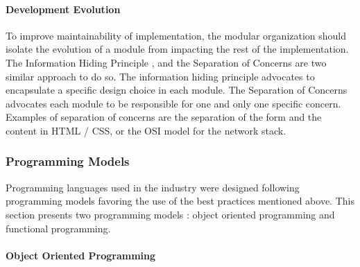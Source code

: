 \paragraph{Development Evolution}

To improve maintainability of implementation, the modular organization should isolate the evolution of a module from impacting the rest of the implementation.
The Information Hiding Principle \cite{Parnas1972}, and the Separation of Concerns \cite{Tarr1999,Hursch1995} are two similar approach to do so.
The information hiding principle advocates to encapsulate a specific design choice in each module.
The Separation of Concerns advocates each module to be responsible for one and only one specific concern.
Examples of separation of concerns are the separation of the form and the content in HTML / CSS, or the OSI model for the network stack.

\subsubsection{Programming Models} \label{chapter3:software-design:programming-models}

Programming languages used in the industry were designed following programming models favoring the use of the best practices mentioned above.
This section presents two programming models : object oriented programming and functional programming.

\paragraph{Object Oriented Programming}


